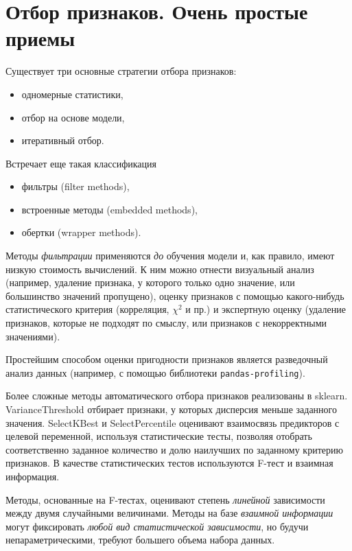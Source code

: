 \documentclass[%
	11pt,
	a4paper,
	utf8,
		]{article}
\begin{document}
\section{Отбор признаков. Очень простые приемы}

Существует три основные стратегии отбора признаков:
\begin{itemize}
	\item одномерные статистики,
	
	\item отбор на основе модели,
	
	\item итеративный отбор.
\end{itemize}

Встречает еще такая классификация
\begin{itemize}
	\item фильтры (filter methods),
	
	\item встроенные методы (embedded methods),
	
	\item обертки (wrapper methods).
\end{itemize}

Методы \emph{фильтрации} применяются \emph{до} обучения модели и, как правило, имеют низкую стоимость вычислений. К ним можно отнести визуальный анализ (например, удаление признака, у которого только одно значение, или большинство значений пропущено), оценку признаков с помощью какого-нибудь статистического критерия (корреляция, $ \chi^2 $ и пр.) и экспертную оценку (удаление признаков, которые не подходят по смыслу, или признаков с некорректными значениями).

Простейшим способом оценки пригодности признаков является разведочный анализ данных (например, с помощью библиотеки \texttt{pandas-profiling}).

Более сложные методы автоматического отбора признаков реализованы в sklearn. VarianceThreshold отбирает признаки, у которых дисперсия меньше заданного значения. SelectKBest и SelectPercentile оценивают взаимосвязь предикторов с целевой переменной, используя статистические тесты, позволяя отобрать соответственно заданное количество и долю наилучших по заданному критерию признаков. В качестве статистических тестов используются F-тест и взаимная информация.

Методы, основанные на F-тестах, оценивают степень \emph{линейной} зависимости между двумя случайными величинами. Методы на базе \emph{взаимной информации} могут фиксировать \emph{любой вид статистической зависимости}, но будучи непараметрическими, требуют большего объема набора данных.
\end{document}
